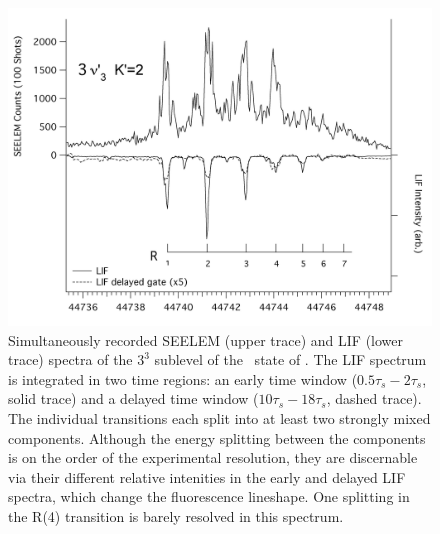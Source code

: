 \documentclass[12pt]{mitthesis}
\begin{document}


\begin{figure}
  \caption{Simultaneously recorded SEELEM (upper trace) and LIF (lower
    trace) spectra of the $3^3$  sublevel of the \astate\ state
    of .  The LIF spectrum is integrated in two time regions:
    an early time window ($0.5\tau_s-2\tau_s$, solid trace) and a
    delayed time window ($10\tau_s-18\tau_s$, dashed trace).  The
    individual transitions each split into at least two strongly mixed
    components.  Although the energy splitting between the components
    is on the order of the experimental resolution, they are
    discernable via their different relative intenities in the early
    and delayed LIF spectra, which change the fluorescence lineshape.
    One splitting in the R(4) transition is barely resolved in this
    spectrum.  }
  \label{fig:spectrum-33k2}
  \centering
  \includegraphics[width=7in,angle=90]{acetylene-33k2-r1r7.png}
\end{figure}
\end{document}
